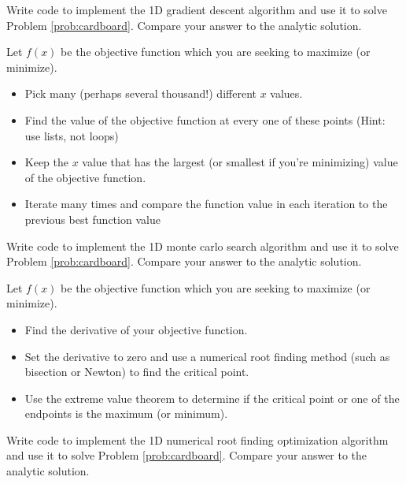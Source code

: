 \begin{problem}
    Write code to implement the 1D gradient descent algorithm and use it to solve
    Problem \ref{prob:cardboard}. Compare your answer to the analytic solution.
\end{problem}

\begin{algorithm}
    Let $f(x)$ be the objective function which you are seeking to maximize (or minimize).
    \begin{itemize}
        \item Pick many (perhaps several thousand!) different $x$ values.
        \item Find the value of the objective function at every one of
            these points (Hint: use lists, not loops)
        \item Keep the $x$ value that has the largest (or smallest if
            you're minimizing) value of the objective function.
        \item Iterate many times and compare the function value in each
            iteration to the previous best function value
    \end{itemize}
\end{algorithm}
\begin{problem}
    Write code to implement the 1D monte carlo search algorithm and use it to solve
    Problem \ref{prob:cardboard}. Compare your answer to the analytic solution.
\end{problem}

\begin{algorithm}
    Let $f(x)$ be the objective function which you are seeking to maximize (or minimize).
    \begin{itemize}
        \item Find the derivative of your objective function.
        \item Set the derivative to zero and use a numerical root finding
            method (such as bisection or Newton) to find the critical
            point.
        \item Use the extreme value theorem to determine if the critical point or one of
            the endpoints is the maximum (or minimum).
    \end{itemize}
\end{algorithm}
\begin{problem}
    Write code to implement the 1D numerical root finding optimization algorithm and use
    it to solve Problem \ref{prob:cardboard}. Compare your answer to the analytic solution.
\end{problem}





